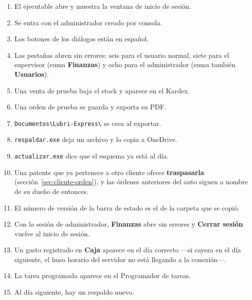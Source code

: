 \documentclass[11pt,a4paper]{article}
\begin{document}
\begin{enumerate}
  \item El ejecutable abre y muestra la ventana de inicio de sesión.
  \item Se entra con el administrador creado por consola.
  \item Los botones de los diálogos están en español.
  \item Las pestañas abren sin errores: seis para el usuario normal, siete para
        el supervisor (suma \textbf{Finanzas}) y ocho para el administrador
        (suma también \textbf{Usuarios}).
  \item Una venta de prueba baja el stock y aparece en el Kardex.
  \item Una orden de prueba se guarda y exporta su PDF.
  \item \texttt{Documentos\textbackslash Lubri-Express\textbackslash} se crea al
        exportar.
  \item \texttt{respaldar.exe} deja un archivo y lo copia a OneDrive.
  \item \texttt{actualizar.exe} dice que el esquema ya está al día.
  \item Una patente que ya pertenece a otro cliente ofrece \textbf{traspasarla}
        (sección~\ref{sec:cliente-orden}), y las órdenes anteriores del auto
        siguen a nombre de su dueño de entonces.
  \item El número de versión de la barra de estado es el de la carpeta que se copió.
  \item Con la sesión de administrador, \textbf{Finanzas} abre sin errores y
        \textbf{Cerrar sesión} vuelve al inicio de sesión.
  \item Un gasto registrado en \textbf{Caja} aparece en el día correcto ---si
        cayera en el día siguiente, el huso horario del servidor no está
        llegando a la conexión---.
  \item La tarea programada aparece en el Programador de tareas.
  \item Al día siguiente, hay un respaldo nuevo.
\end{enumerate}
\end{document}
